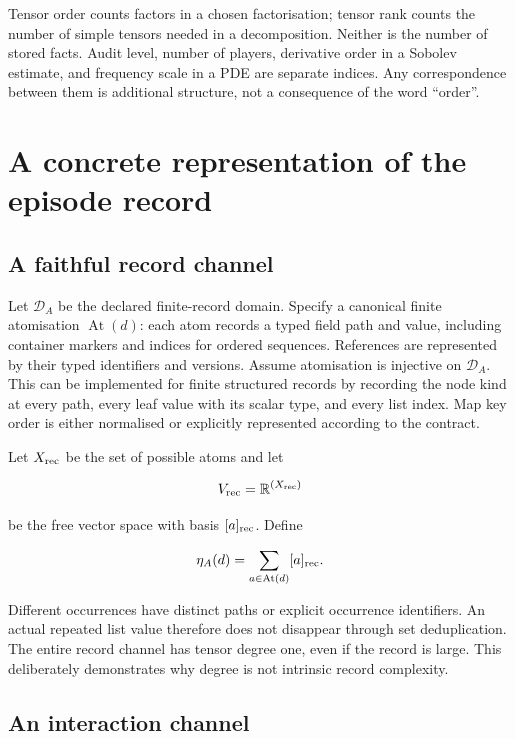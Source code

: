 \documentclass[11pt,a4paper]{article}
\begin{document}
Tensor order counts factors in a chosen factorisation; tensor rank
counts the number of simple tensors needed in a decomposition. Neither
is the number of stored facts. Audit level, number of players,
derivative order in a Sobolev estimate, and frequency scale in a PDE are
separate indices. Any correspondence between them is additional
structure, not a consequence of the word ``order''.

\section{A concrete representation of the episode
record}\label{a-concrete-representation-of-the-episode-record}

\subsection{A faithful record channel}\label{a-faithful-record-channel}

Let \(\mathscr D_A\) be the declared finite-record domain. Specify a
canonical finite atomisation \(\operatorname{At}(d)\): each atom records
a typed field path and value, including container markers and indices
for ordered sequences. References are represented by their typed
identifiers and versions. Assume atomisation is injective on
\(\mathscr D_A\). This can be implemented for finite structured records
by recording the node kind at every path, every leaf value with its
scalar type, and every list index. Map key order is either normalised or
explicitly represented according to the contract.

Let \(X_{\rm rec}\) be the set of possible atoms and let

\nopagebreak[4]

\[
V_{\rm rec}=\mathbb R^{(X_{\rm rec})}
\]

be the free vector space with basis \([a]_{\rm rec}\). Define

\nopagebreak[4]

\[
\eta_A(d)=\sum_{a\in\operatorname{At}(d)}[a]_{\rm rec}.
\]

Different occurrences have distinct paths or explicit occurrence
identifiers. An actual repeated list value therefore does not disappear
through set deduplication. The entire record channel has tensor degree
one, even if the record is large. This deliberately demonstrates why
degree is not intrinsic record complexity.

\subsection{An interaction channel}\label{an-interaction-channel}
\end{document}
